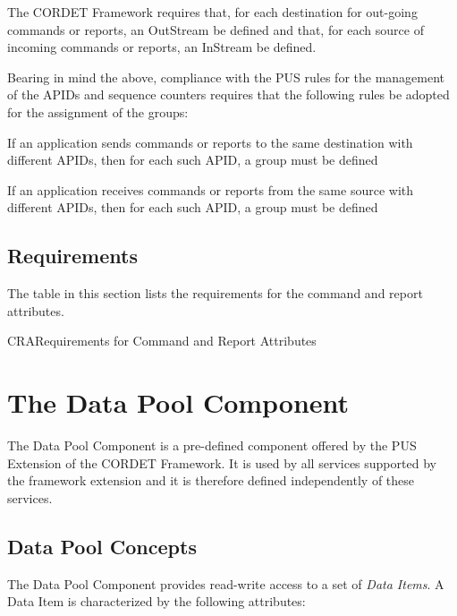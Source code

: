 \documentclass[a4paper,10pt]{article}
\let\stdsection\section
\renewcommand\section{\newpage\stdsection}
\newenvironment{fw_itemize}						%
{\begin{itemize}
  \setlength{\itemsep}{1mm}
  \setlength{\parskip}{0pt}
  \setlength{\parsep}{0pt}}
{\end{itemize}}
\newenvironment{cr_req}[2]
{
\begin{longtable}{|l|p{11.8cm}|}
\caption{#2}\label{tab:Req-#1} \\
\hline
\rowcolor{light-gray}
\textbf{Req. ID} & \textbf{Requirement Text}\\
\hline\hline
\endfirsthead
\rowcolor{light-gray}
\textbf{Req. ID} & \textbf{Requirement Text}\\
\hline\hline
\endhead
\DTLforeach*[\DTLiseq{\cat}{#1}]{dbReq}{\cat=Category,\type=Type,\id=Id,\reqText=Text}
{\DTLiffirstrow{}{\\\hline}P-\cat-\id/\type & \textit{\reqText}}\\\hline
}
{\end{longtable}}
\begin{document}
The CORDET Framework requires that, for each destination for out-going commands or reports, an OutStream be defined and that, for each source of incoming commands or reports, an InStream be defined. 

Bearing in mind the above, compliance with the PUS rules for the management of the APIDs and sequence counters requires that the following rules be adopted for the assignment of the groups: 

\begin{fw_itemize}
\item If an application sends commands or reports to the same destination with different APIDs, then for each such APID, a group must be defined
\item If an application receives commands or reports from the same source  with different APIDs, then for each such APID, a group must be defined
\end{fw_itemize}


\newpage
\subsection{Requirements}
The table in this section lists the requirements for the command and report attributes.

\begin{cr_req}{CRA}{Requirements for Command and Report Attributes}
\end{cr_req}
 

\section{The Data Pool Component}\label{sec:dp}
The Data Pool Component is a pre-defined component offered by the PUS Extension of the CORDET Framework. It is used by all services supported by the framework extension and it is therefore defined independently of these services.

\subsection{Data Pool Concepts}\label{sec:dpConcepts}
The Data Pool Component provides read-write access to a set of \textit{Data Items}. A Data Item is characterized by the following attributes: 
\end{document}
